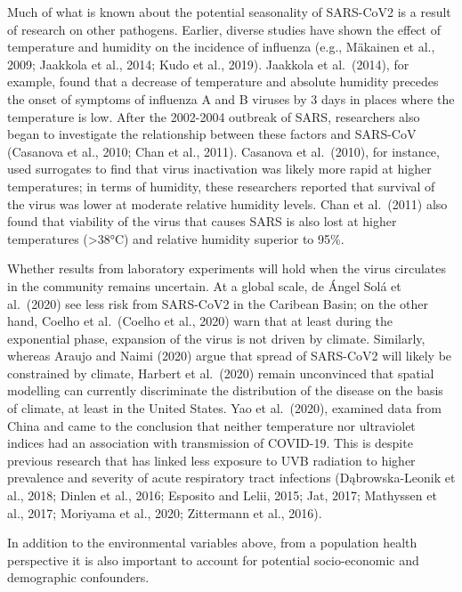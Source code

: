 \documentclass[]{elsarticle} %
\begin{document}
Much of what is known about the potential seasonality of SARS-CoV2 is a
result of research on other pathogens. Earlier, diverse studies have
shown the effect of temperature and humidity on the incidence of
influenza (e.g., Mäkainen et al., 2009; Jaakkola et al., 2014; Kudo et
al., 2019). Jaakkola et al.~(2014), for example, found that a decrease
of temperature and absolute humidity precedes the onset of symptoms of
influenza A and B viruses by 3 days in places where the temperature is
low. After the 2002-2004 outbreak of SARS, researchers also began to
investigate the relationship between these factors and SARS-CoV
(Casanova et al., 2010; Chan et al., 2011). Casanova et al.~(2010), for
instance, used surrogates to find that virus inactivation was likely
more rapid at higher temperatures; in terms of humidity, these
researchers reported that survival of the virus was lower at moderate
relative humidity levels. Chan et al.~(2011) also found that viability
of the virus that causes SARS is also lost at higher temperatures
(\textgreater38°C) and relative humidity superior to 95\%.

Whether results from laboratory experiments will hold when the virus
circulates in the community remains uncertain. At a global scale, de
Ángel Solá et al.~(2020) see less risk from SARS-CoV2 in the Caribean
Basin; on the other hand, Coelho et al.~(Coelho et al., 2020) warn that
at least during the exponential phase, expansion of the virus is not
driven by climate. Similarly, whereas Araujo and Naimi (2020) argue that
spread of SARS-CoV2 will likely be constrained by climate, Harbert et
al.~(2020) remain unconvinced that spatial modelling can currently
discriminate the distribution of the disease on the basis of climate, at
least in the United States. Yao et al.~(2020), examined data from China
and came to the conclusion that neither temperature nor ultraviolet
indices had an association with transmission of COVID-19. This is
despite previous research that has linked less exposure to UVB radiation
to higher prevalence and severity of acute respiratory tract infections
(Dąbrowska-Leonik et al., 2018; Dinlen et al., 2016; Esposito and Lelii,
2015; Jat, 2017; Mathyssen et al., 2017; Moriyama et al., 2020;
Zittermann et al., 2016).

In addition to the environmental variables above, from a population
health perspective it is also important to account for potential
socio-economic and demographic confounders.
\end{document}
